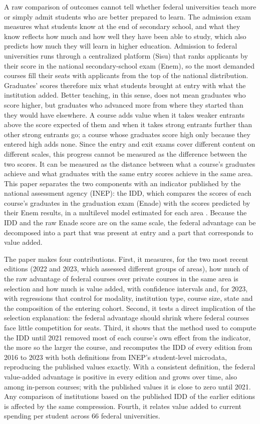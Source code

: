 \documentclass[11pt,a4paper]{article}
\begin{document}
A raw comparison of outcomes cannot tell whether federal universities teach more or simply admit students who are better prepared to learn. The admission exam measures what students know at the end of secondary school, and what they know reflects how much and how well they have been able to study, which also predicts how much they will learn in higher education. Admission to federal universities runs through a centralized platform (Sisu) that ranks applicants by their score in the national secondary-school exam (Enem), so the most demanded courses fill their seats with applicants from the top of the national distribution. Graduates' scores therefore mix what students brought at entry with what the institution added. Better teaching, in this sense, does not mean graduates who score higher, but graduates who advanced more from where they started than they would have elsewhere. A course adds value when it takes weaker entrants above the score expected of them and when it takes strong entrants further than other strong entrants go; a course whose graduates score high only because they entered high adds none. Since the entry and exit exams cover different content on different scales, this progress cannot be measured as the difference between the two scores. It can be measured as the distance between what a course's graduates achieve and what graduates with the same entry scores achieve in the same area. This paper separates the two components with an indicator published by the national assessment agency (INEP): the IDD, which compares the scores of each course's graduates in the graduation exam (Enade) with the scores predicted by their Enem results, in a multilevel model estimated for each area \citep{inep2023idd}. Because the IDD and the raw Enade score are on the same scale, the federal advantage can be decomposed into a part that was present at entry and a part that corresponds to value added.

The paper makes four contributions. First, it measures, for the two most recent editions (2022 and 2023, which assessed different groups of areas), how much of the raw advantage of federal courses over private courses in the same area is selection and how much is value added, with confidence intervals and, for 2023, with regressions that control for modality, institution type, course size, state and the composition of the entering cohort. Second, it tests a direct implication of the selection explanation: the federal advantage should shrink where federal courses face little competition for seats. Third, it shows that the method used to compute the IDD until 2021 removed most of each course's own effect from the indicator, the more so the larger the course, and recomputes the IDD of every edition from 2016 to 2023 with both definitions from INEP's student-level microdata, reproducing the published values exactly. With a consistent definition, the federal value-added advantage is positive in every edition and grows over time, also among in-person courses; with the published values it is close to zero until 2021. Any comparison of institutions based on the published IDD of the earlier editions is affected by the same compression. Fourth, it relates value added to current spending per student across 66 federal universities.
\end{document}
